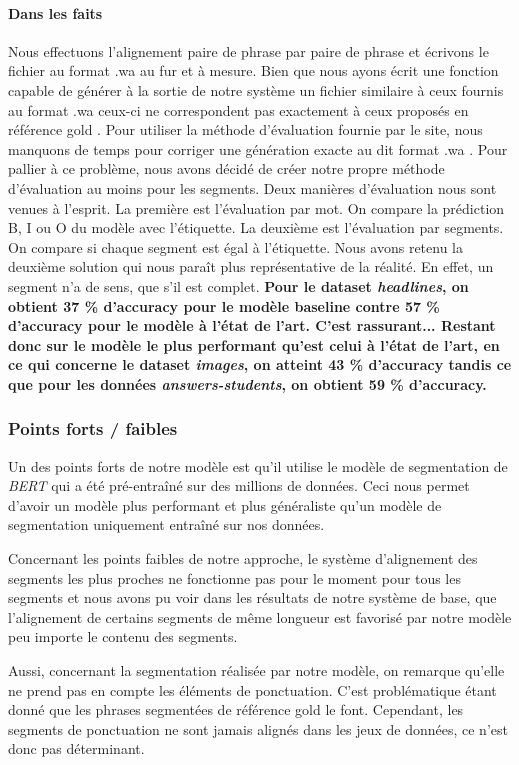 \documentclass[a4paper, twoside, 11pt]{article}
\begin{document}
 \paragraph{Dans les faits}
 Nous effectuons l'alignement paire de phrase par paire de phrase et écrivons le fichier au format \og .wa \fg{} au fur et à mesure. Bien que nous ayons écrit une fonction capable de générer à la sortie de notre système un fichier similaire à ceux fournis au format \og .wa \fg{} ceux-ci ne correspondent pas exactement à ceux proposés en référence \og gold \fg{}. Pour utiliser la méthode d’évaluation fournie par le site, nous manquons de temps pour corriger une génération exacte au dit format \og .wa \fg{}. Pour pallier à ce problème, nous avons décidé de créer notre propre méthode d’évaluation au moins pour les segments. Deux manières d’évaluation nous sont venues à l’esprit. La première est l’évaluation par mot. On compare la prédiction B, I ou O du modèle avec l'étiquette. La deuxième est l’évaluation par segments. On compare si chaque segment est égal à l'étiquette. Nous avons retenu la deuxième solution qui nous paraît plus représentative de la réalité. En effet, un segment n’a de sens, que s’il est complet. \textbf{Pour le dataset \textit{headlines}, on obtient 37 \% d'accuracy pour le modèle baseline contre 57 \% d'accuracy pour le modèle à l'état de l'art. C'est rassurant... Restant donc sur le modèle le plus performant qu'est celui à l'état de l'art, en ce qui concerne le dataset \textit{images}, on atteint 43 \% d'accuracy tandis ce que pour les données \textit{answers-students}, on obtient 59 \% d'accuracy.}


 \subsubsection{Points forts / faibles}
 Un des points forts de notre modèle est qu'il utilise le modèle de segmentation de \textit{BERT} qui a été pré-entraîné sur des millions de données. Ceci nous permet d'avoir un modèle plus performant et plus généraliste qu'un modèle de segmentation uniquement entraîné sur nos données.

Concernant les points faibles de notre approche, le système d'alignement des segments les plus proches ne fonctionne pas pour le moment pour tous les segments et nous avons pu voir dans les résultats de notre système de base, que l'alignement de certains segments de même longueur est favorisé par notre modèle peu importe le contenu des segments.

 Aussi, concernant la segmentation réalisée par notre modèle, on remarque qu'elle ne prend pas en compte les éléments de ponctuation. C'est problématique étant donné que les phrases segmentées de référence \og gold \fg{} le font. Cependant, les segments de ponctuation ne sont jamais alignés dans les jeux de données, ce n'est donc pas déterminant.
\end{document}
